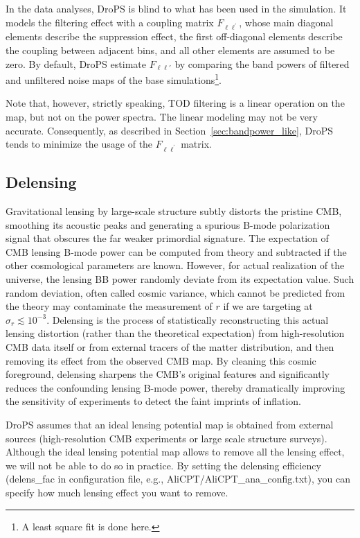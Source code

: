 \documentclass[12pt, a4paper]{ctexart} %
\begin{document}
In the data analyses, DroPS is blind to what has been used in the simulation. It models the filtering effect with a coupling matrix $F_{\ell\ell^\prime}$, whose main diagonal elements describe the suppression effect, the first off-diagonal elements describe the coupling between adjacent bins, and all other elements are assumed to be zero. By default, DroPS estimate $F_{\ell\ell'}$ by comparing the band powers of filtered and unfiltered noise maps of the base simulations\footnote{A least square fit is done here.}.

Note that, however, strictly speaking, TOD filtering is a linear operation on the map, but not on the power spectra. The linear modeling may not be very accurate. Consequently, as described in Section~\ref{sec:bandpower_like}, DroPS tends to minimize the usage of the $F_{\ell\ell^\prime}$ matrix.

\subsection{Delensing}


Gravitational lensing by large-scale structure subtly distorts the pristine CMB, smoothing its acoustic peaks and generating a spurious B-mode polarization signal that obscures the far weaker primordial signature. The expectation of CMB lensing B-mode power can be computed from theory and subtracted if the other cosmological parameters are known. However, for actual realization of the universe, the lensing BB power randomly deviate from its expectation value. Such random deviation, often called cosmic variance, which cannot be predicted from the theory may contaminate the measurement of $r$ if we are targeting at $\sigma_r \lesssim 10^{-3}$. Delensing is the process of statistically reconstructing this actual lensing distortion (rather than the theoretical expectation) from high-resolution CMB data itself or from external tracers of the matter distribution, and then removing its effect from the observed CMB map. By cleaning this cosmic foreground, delensing sharpens the CMB's original features and significantly reduces the confounding lensing B-mode power, thereby dramatically improving the sensitivity of experiments to detect the faint imprints of inflation.

DroPS assumes that an ideal lensing potential map is obtained from external sources (high-resolution CMB experiments or large scale structure surveys). Although the ideal lensing potential map allows to remove all the lensing effect, we will not be able to do so in practice. By setting the delensing efficiency (delens\_fac in configuration file, e.g., AliCPT/AliCPT\_ana\_config.txt), you can specify how much lensing effect you want to remove.
\end{document}
